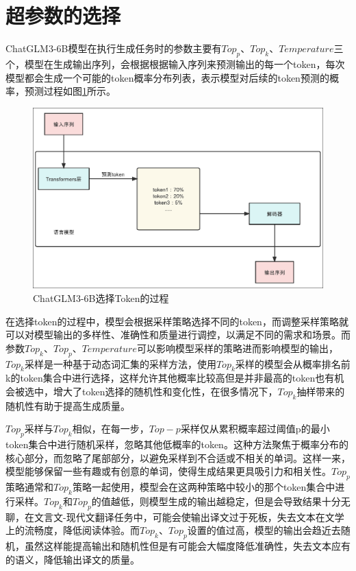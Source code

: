 \documentclass[
    decl-page,  %
    ,fontset = win, %
  ]{njuthesis}
\begin{document}
\section{超参数的选择}
ChatGLM3-6B模型在执行生成任务时的参数主要有$Top_p$、$Top_k$、$Temperature$三个，模型在生成输出序列，会根据根据输入序列来预测输出的每一个token，每次模型都会生成一个可能的token概率分布列表，表示模型对后续的token预测的概率，预测过程如图\ref{yu ce}所示。

\begin{figure}[ht]
  \centering
  \includegraphics[width=\textwidth]{image/预测token.pdf}
  \caption{ChatGLM3-6B选择Token的过程}
  \label{yu ce}
\end{figure}

在选择token的过程中，模型会根据采样策略选择不同的token，而调整采样策略就可以对模型输出的多样性、准确性和质量进行调控，以满足不同的需求和场景。而参数$Top_k$、$Top_p$、$Temperature$可以影响模型采样的策略进而影响模型的输出，$Top_k$采样是一种基于动态词汇集的采样方法，使用$Top_k$采样的模型会从概率排名前k的token集合中进行选择，这样允许其他概率比较高但是并非最高的token也有机会被选中，增大了token选择的随机性和变化性，在很多情况下，$Top_k$抽样带来的随机性有助于提高生成质量。

$Top_p$采样与$Top_k$相似，在每一步，$Top-p$采样仅从累积概率超过阈值p的最小token集合中进行随机采样，忽略其他低概率的token。这种方法聚焦于概率分布的核心部分，而忽略了尾部部分，以避免采样到不合适或不相关的单词。这样一来，模型能够保留一些有趣或有创意的单词，使得生成结果更具吸引力和相关性。$Top_p$策略通常和$Top_k$策略一起使用，模型会在这两种策略中较小的那个token集合中进行采样。$Top_k$和$Top_p$的值越低，则模型生成的输出越稳定，但是会导致结果十分无聊，在文言文-现代文翻译任务中，可能会使输出译文过于死板，失去文本在文学上的流畅度，降低阅读体验。而$Top_k$、$Top_p$设置的值过高，模型的输出会趋近去随机，虽然这样能提高输出和随机性但是有可能会大幅度降低准确性，失去文本应有的语义，降低输出译文的质量。
\end{document}
